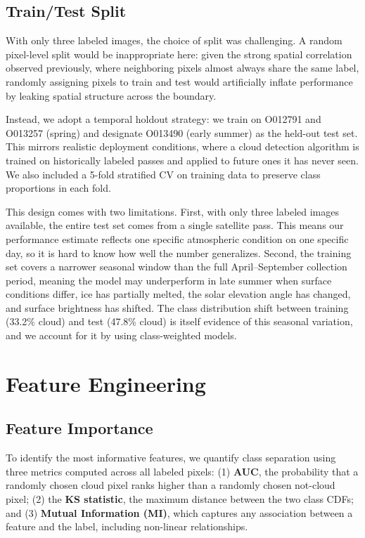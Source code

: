 \documentclass[10pt,letterpaper]{article}
\begin{document}
\subsection{Train/Test Split}

With only three labeled images, the choice of split was challenging. A random pixel-level split would be inappropriate here: given the strong spatial correlation observed previously, where neighboring pixels almost always share the same label, randomly assigning pixels to train and test would artificially inflate performance by leaking spatial structure across the boundary.

Instead, we adopt a temporal holdout strategy: we train on O012791 and O013257 (spring) and designate O013490 (early summer) as the held-out test set. This mirrors realistic deployment conditions, where a cloud detection algorithm is trained on historically labeled passes and applied to future ones it has never seen. We also included a 5-fold stratified CV on training data to preserve class proportions in each fold.

This design comes with two limitations. First, with only three labeled images available, the entire test set comes from a single satellite pass. This means our performance estimate reflects one specific atmospheric condition on one specific day, so it is hard to know how well the number generalizes. Second, the training set covers a narrower seasonal window than the full April–September collection period, meaning the model may underperform in late summer when surface conditions differ, ice has partially melted, the solar elevation angle has changed, and surface brightness has shifted. The class distribution shift between training (33.2\% cloud) and test (47.8\% cloud) is itself evidence of this seasonal variation, and we account for it by using class-weighted models.


\section{Feature Engineering}

\subsection{Feature Importance}

To identify the most informative features, we quantify class separation using three metrics computed across all labeled pixels: (1) \textbf{AUC}, the probability that a randomly chosen cloud pixel ranks higher than a randomly chosen not-cloud pixel; (2) the \textbf{KS statistic}, the maximum distance between the two class CDFs; and (3) \textbf{Mutual Information (MI)}, which captures any association between a feature and the label, including non-linear relationships.
\end{document}
